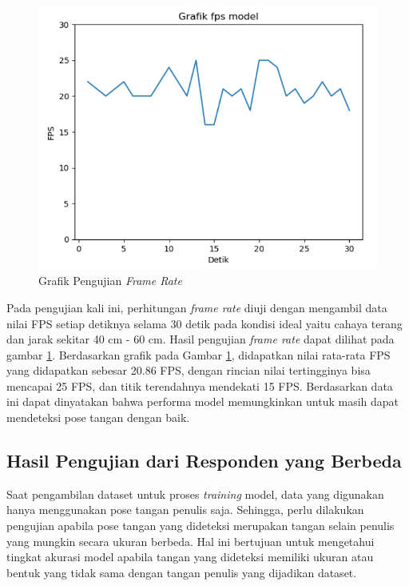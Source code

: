 \newpage

\begin{figure}[!htb]
  \centering
  \includegraphics[scale=0.7]{gambar/pengujian-fps/grafik-pengujian-fps.png}
  \caption{Grafik Pengujian \emph{Frame Rate}}
  \label{fig:Grafik Pengujian Frame Rate}
\end{figure}

Pada pengujian kali ini, perhitungan \emph{frame rate} diuji dengan mengambil data nilai FPS setiap detiknya selama 30 detik pada kondisi ideal yaitu cahaya terang dan jarak sekitar 40 cm - 60 cm. Hasil pengujian \emph{frame rate} dapat dilihat pada gambar \ref{fig:Grafik Pengujian Frame Rate}. Berdasarkan grafik pada Gambar \ref{fig:Grafik Pengujian Frame Rate}, didapatkan nilai rata-rata FPS yang didapatkan sebesar 20.86 FPS, dengan rincian nilai tertingginya bisa mencapai 25 FPS, dan titik terendahnya mendekati 15 FPS. Berdasarkan data ini dapat dinyatakan bahwa performa model memungkinkan untuk masih dapat mendeteksi pose tangan dengan baik. 

\subsection{Hasil Pengujian dari Responden yang Berbeda}
\label{subsec:Hasil Pengujian dari Responden yang Berbeda}
Saat pengambilan dataset untuk proses \emph{training} model, data yang digunakan hanya menggunakan pose tangan penulis saja. Sehingga, perlu dilakukan pengujian apabila pose tangan yang dideteksi merupakan tangan selain penulis yang mungkin secara ukuran berbeda. Hal ini bertujuan untuk mengetahui tingkat akurasi model apabila tangan yang dideteksi memiliki ukuran atau bentuk yang tidak sama dengan tangan penulis yang dijadikan dataset.

